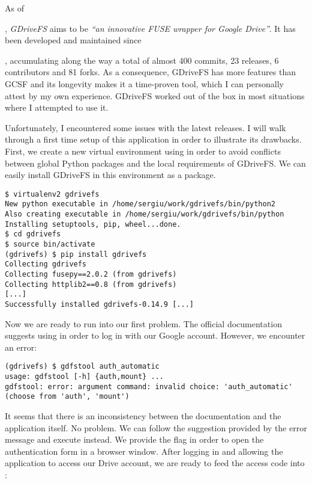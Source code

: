As of \date{June 2018}, \emph{GDriveFS} aims to be \emph{``an innovative FUSE wrapper for Google Drive''}\cite{gdrivefs}. It has been developed and maintained since \date{August 2012}, accumulating along the way a total of almost 400 commits, 23 releases, 6 contributors and 81 forks. As a consequence, GDriveFS has more features than GCSF and its longevity makes it a time-proven tool, which I can personally attest by my own experience. GDriveFS worked out of the box in most situations where I attempted to use it.

Unfortunately, I encountered some issues with the latest releases. I will walk through a first time setup of this application in order to illustrate its drawbacks. First, we create a new virtual environment using  in order to avoid conflicts between global Python packages and the local requirements of GDriveFS. We can easily install GDriveFS in this environment as a  package.

\begin{lstlisting}[caption=Creating a virtual environment and installing GDriveFS]
$ virtualenv2 gdrivefs
New python executable in /home/sergiu/work/gdrivefs/bin/python2
Also creating executable in /home/sergiu/work/gdrivefs/bin/python
Installing setuptools, pip, wheel...done.
$ cd gdrivefs
$ source bin/activate
(gdrivefs) $ pip install gdrivefs
Collecting gdrivefs
Collecting fusepy==2.0.2 (from gdrivefs)
Collecting httplib2==0.8 (from gdrivefs)
[...]
Successfully installed gdrivefs-0.14.9 [...]
\end{lstlisting}

Now we are ready to run into our first problem. The official documentation\cite{gdrivefs} suggests using  in order to log in with our Google account. However, we encounter an error:

\begin{lstlisting}[caption=GDriveFS nonexistent authentication command]
(gdrivefs) $ gdfstool auth_automatic
usage: gdfstool [-h] {auth,mount} ...
gdfstool: error: argument command: invalid choice: 'auth_automatic' (choose from 'auth', 'mount')
\end{lstlisting}

It seems that there is an inconsistency between the documentation and the application itself. No problem. We can follow the suggestion provided by the error message and execute  instead. We provide the  flag in order to open the authentication form in a browser window. After logging in and allowing the application to access our Drive account, we are ready to feed the access code into :

